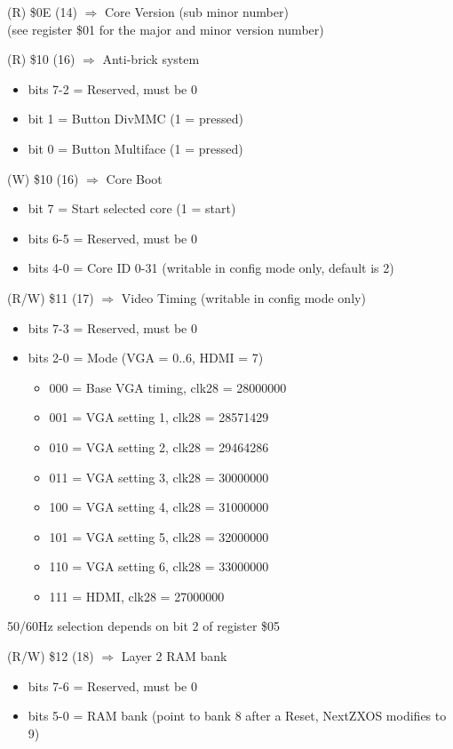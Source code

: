 (R) \$0E (14) $\Rightarrow$ Core Version (sub minor number)\\
(see register \$01 for the major and minor version number)

(R) \$10 (16) $\Rightarrow$ Anti-brick system
\begin{itemize}
\item[] bits 7-2 = Reserved, must be 0
\item[] bit 1 = Button DivMMC (1 = pressed)
\item[] bit 0 = Button Multiface (1 = pressed)
\end{itemize}

(W) \$10 (16) $\Rightarrow$ Core Boot
\begin{itemize}
\item[] bit 7 = Start selected core (1 = start)
\item[] bits 6-5 = Reserved, must be 0
\item[] bits 4-0 = Core ID 0-31 (writable in config mode only, default is 2)
\end{itemize}

(R/W) \$11 (17) $\Rightarrow$ Video Timing (writable in config mode only)
\begin{itemize}
\item[] bits 7-3 = Reserved, must be 0
\item[] bits 2-0 = Mode (VGA = 0..6, HDMI = 7)
  \begin{itemize}
  \item[] 000 = Base VGA timing, clk28 = 28000000
  \item[] 001 = VGA setting 1, clk28 = 28571429
  \item[] 010 = VGA setting 2, clk28 = 29464286
  \item[] 011 = VGA setting 3, clk28 = 30000000
  \item[] 100 = VGA setting 4, clk28 = 31000000
  \item[] 101 = VGA setting 5, clk28 = 32000000
  \item[] 110 = VGA setting 6, clk28 = 33000000
  \item[] 111 = HDMI, clk28 = 27000000
  \end{itemize}
\end{itemize}
50/60Hz selection depends on bit 2 of register \$05

(R/W) \$12 (18) $\Rightarrow$ Layer 2 RAM bank
\begin{itemize}
\item[] bits 7-6 = Reserved, must be 0
\item[] bits 5-0 = RAM bank (point to bank 8 after a Reset, NextZXOS
  modifies to 9)
\end{itemize}

